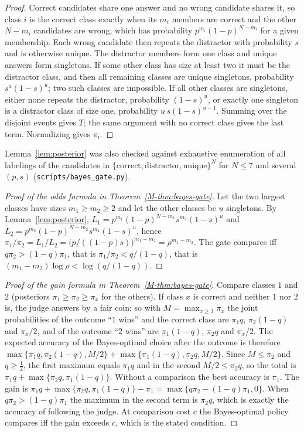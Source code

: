 \begin{proof}
Correct candidates share one answer and no wrong candidate shares it, so class $i$ is the correct class exactly when its $m_i$
members are correct and the other $N-m_i$ candidates are wrong, which has probability $p^{m_i}(1-p)^{N-m_i}$ for a given
membership. Each wrong candidate then repeats the distractor with probability $s$ and is otherwise unique. The distractor
members form one class and unique answers form singletons. If some other class has size at least two it must be the distractor
class, and then all remaining classes are unique singletons, probability $s^{a}(1-s)^{u}$; two such classes are impossible.
If all other classes are singletons, either none repeats the distractor, probability $(1-s)^u$, or exactly one singleton is a
distractor class of size one, probability $u\,s(1-s)^{u-1}$. Summing over the disjoint events gives $T$; the same argument with
no correct class gives the last term. Normalizing gives $\pi_i$.
\end{proof}

Lemma~\ref{lem:posterior} was also checked against exhaustive enumeration of all labelings of the candidates in
$\{\text{correct},\text{distractor},\text{unique}\}^N$ for $N\le7$ and several $(p,s)$ (\texttt{scripts/bayes\_gate.py}).

\begin{proof}[Proof of the odds formula in Theorem~\ref{M-thm:bayes-gate}]
Let the two largest classes have sizes $m_1\ge m_2\ge2$ and let the other classes be $u$ singletons. By Lemma~\ref{lem:posterior},
$L_1=p^{m_1}(1-p)^{N-m_1}s^{m_2}(1-s)^u$ and $L_2=p^{m_2}(1-p)^{N-m_2}s^{m_1}(1-s)^u$, hence
$\pi_1/\pi_2=L_1/L_2=\bigl(p/((1-p)s)\bigr)^{m_1-m_2}=\rho^{m_1-m_2}$.
The gate compares iff $q\pi_2>(1-q)\pi_1$, that is $\pi_1/\pi_2<q/(1-q)$, that is $(m_1-m_2)\log\rho<\log(q/(1-q))$.
\end{proof}

\begin{proof}[Proof of the gain formula in Theorem~\ref{M-thm:bayes-gate}]
Compare classes $1$ and $2$ (posteriors $\pi_1\ge\pi_2\ge\pi_x$ for the others). If class $x$ is correct and neither $1$ nor $2$ is,
the judge answers by a fair coin; so with $M=\max_{x\ge3}\pi_x$ the joint probabilities of the outcome ``$1$ wins'' and the
correct class are $\pi_1q$, $\pi_2(1-q)$ and $\pi_x/2$, and of the outcome ``$2$ wins'' are $\pi_1(1-q)$, $\pi_2q$ and $\pi_x/2$.
The expected accuracy of the Bayes-optimal choice after the outcome is therefore
$\max\{\pi_1q,\pi_2(1-q),M/2\}+\max\{\pi_1(1-q),\pi_2q,M/2\}$. Since $M\le\pi_2$ and $q\ge\tfrac12$, the first maximum equals
$\pi_1q$ and in the second $M/2\le\pi_2q$, so the total is $\pi_1q+\max\{\pi_2q,\pi_1(1-q)\}$. Without a comparison the best
accuracy is $\pi_1$. The gain is $\pi_1q+\max\{\pi_2q,\pi_1(1-q)\}-\pi_1=\max\{q\pi_2-(1-q)\pi_1,0\}$. When
$q\pi_2>(1-q)\pi_1$ the maximum in the second term is $\pi_2q$, which is exactly the accuracy of following the judge. At comparison cost
$c$ the Bayes-optimal policy compares iff the gain exceeds $c$, which is the stated condition.
\end{proof}

